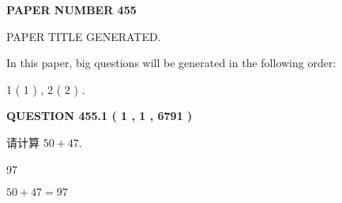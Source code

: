 \documentclass{ctexart}
\begin{document}
   
   
   
\newpage 
\setcounter{page}{ 
   455001 } 
   
   
   
   
 {\textbf{ \Large{ PAPER NUMBER  455  }}}
   
   
\vspace{0.2in}
   
   
   
   
   
   
   
   
 \vspace{0.2in}
 
 
 
 
   
   
 PAPER TITLE GENERATED.
   
   
   
\vspace{0.2in}
   
In this paper, big questions will be generated in the following order: 
   
   
   1 ( 1 )
 ,
   2 ( 2 )
 .
  
\vspace{0.2in}
  
{\textbf{\Large{QUESTION
455.1 
 ( 1 , 1 , 6791 )
}}}
  
  
 
请计算 $ %
50 +  %
47 $.
 
 
 
\noindent{}
 
 

97
 
 
\noindent{}
 
 

 
 
 
\noindent{}
 
 

$ %
50 +  %
47=   %
97$
 
 
\noindent{}
 
 

 
   
   
   
\end{document}

